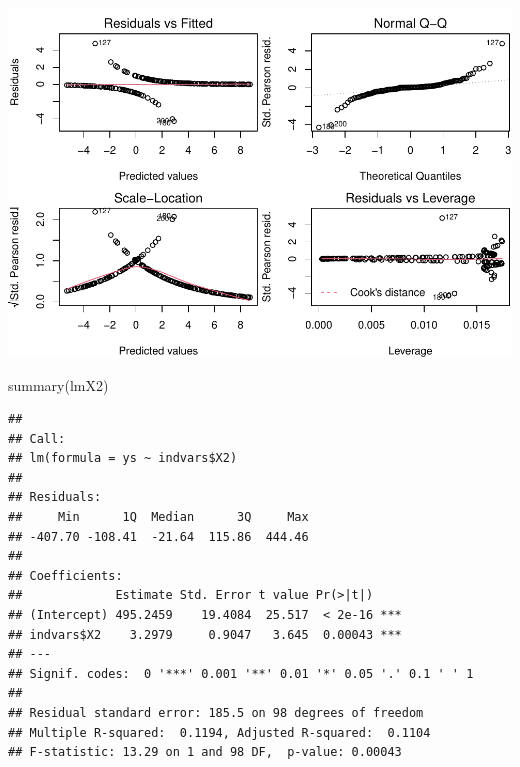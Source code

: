 \documentclass[
]{book}
\newenvironment{Shaded}{\begin{snugshade}}{\end{snugshade}}
\newcommand{\CommentTok}[1]{\textcolor[rgb]{0.56,0.35,0.01}{\textit{#1}}}
\newcommand{\FunctionTok}[1]{\textcolor[rgb]{0.00,0.00,0.00}{#1}}
\newcommand{\NormalTok}[1]{#1}
\newcommand{\OtherTok}[1]{\textcolor[rgb]{0.56,0.35,0.01}{#1}}
\newcommand{\SpecialCharTok}[1]{\textcolor[rgb]{0.00,0.00,0.00}{#1}}
\begin{document}
\includegraphics{ECOMODbook_files/figure-latex/unnamed-chunk-15-2.pdf}

\begin{Shaded}
\begin{Highlighting}[]
\FunctionTok{summary}\NormalTok{(lmX2)}
\end{Highlighting}
\end{Shaded}

\begin{verbatim}
## 
## Call:
## lm(formula = ys ~ indvars$X2)
## 
## Residuals:
##     Min      1Q  Median      3Q     Max 
## -407.70 -108.41  -21.64  115.86  444.46 
## 
## Coefficients:
##             Estimate Std. Error t value Pr(>|t|)    
## (Intercept) 495.2459    19.4084  25.517  < 2e-16 ***
## indvars$X2    3.2979     0.9047   3.645  0.00043 ***
## ---
## Signif. codes:  0 '***' 0.001 '**' 0.01 '*' 0.05 '.' 0.1 ' ' 1
## 
## Residual standard error: 185.5 on 98 degrees of freedom
## Multiple R-squared:  0.1194, Adjusted R-squared:  0.1104 
## F-statistic: 13.29 on 1 and 98 DF,  p-value: 0.00043
\end{verbatim}

\begin{Shaded}
\end{Shaded}
\end{document}
